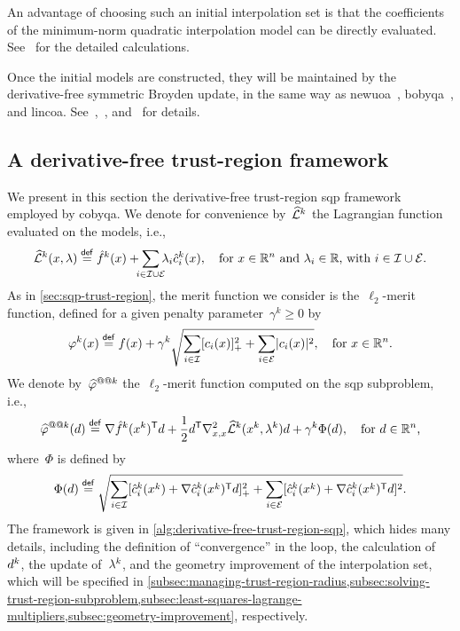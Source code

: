 An advantage of choosing such an initial interpolation set is that the coefficients of the minimum-norm quadratic interpolation model can be directly evaluated.
See~\cite[\S~9]{Powell_2009} for the detailed calculations.

Once the initial models are constructed, they will be maintained by the derivative-free symmetric Broyden update, in the same way as \gls{newuoa}~\cite{Powell_2006}, \gls{bobyqa}~\cite{Powell_2009}, and \gls{lincoa}.
See~\cite{Powell_2004b,Powell_2004c},~\cite[\S~4]{Powell_2006}, and~\cite[\S~4]{Powell_2009} for details.

\subsection{A derivative-free trust-region  framework}
\label{subsec:cobyqa-framework}

We present in this section the derivative-free trust-region \gls{sqp} framework employed by \gls{cobyqa}.
We denote for convenience by~$\lagm[k]$ the Lagrangian function evaluated on the models, i.e.,
\begin{equation*}
    \lagm[k](\iter, \lm) \eqdef \objm[k](\iter) + \sum_{\mathclap{i \in \iub \cup \ieq}} \lm_i \conm[k]{i}(\iter), \quad \text{for~$\iter \in \R^n$ and~$\lm_i \in \R$, with~$i \in \iub \cup \ieq$.}
\end{equation*}
As in \cref{sec:sqp-trust-region}, the merit function we consider is the~$\ell_2$-merit function, defined for a given penalty parameter~$\gamma^k \ge 0$ by
\begin{equation*}
    \merit[k](\iter) \eqdef \obj(x) + \gamma^k \sqrt{\sum_{i \in \iub} \posp{\con{i}(\iter)}^2 + \sum_{i \in \ieq} \abs{\con{i}(\iter)}^2}, \quad \text{for~$\iter \in \R^n$.}
\end{equation*}
We denote by~$\meritm[k]$ the~$\ell_2$-merit function computed on the \gls{sqp} subproblem, i.e.,
\begin{equation}
    \label{eq:l2-merit-function-model}
    \meritm[k](\step) \eqdef \nabla \objm[k](\iter[k])^{\T} \step + \frac{1}{2} \step^{\T} \nabla_{x, x}^2 \lagm[k](\iter[k], \lm[k]) \step + \gamma^k \Phi(\step), \quad \text{for~$\step \in \R^n$,}
\end{equation}
where~$\Phi$ is defined by
\begin{equation}
    \label{eq:l2-merit-function-model-penalty}
    \Phi(d) \eqdef \sqrt{\sum_{i \in \iub} \posp{\conm[k]{i}(\iter[k]) + \nabla \conm[k]{i}(\iter[k])^{\T} \step}^2 + \sum_{i \in \ieq} [\conm[k]{i}(\iter[k]) + \nabla \conm[k]{i}(\iter[k])^{\T} \step]^2}.
\end{equation}
The framework is given in \cref{alg:derivative-free-trust-region-sqp}, which hides many details, including the definition of \enquote{convergence} in the loop, the calculation of~$\step[k]$, the update of~$\lm[k]$, and the geometry improvement of the interpolation set, which will be specified in \cref{subsec:managing-trust-region-radius,subsec:solving-trust-region-subproblem,subsec:least-squares-lagrange-multipliers,subsec:geometry-improvement}, respectively.


